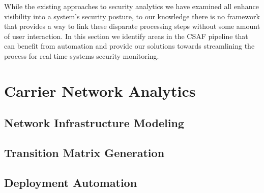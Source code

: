 While the existing approaches to security analytics we have examined all enhance visibility into a system's security posture, to our knowledge there is no framework that provides a way to link these disparate processing steps without some amount of user interaction. In this section we identify areas in the CSAF pipeline that can benefit from automation and provide our solutions towards streamlining the process for real time systems security monitoring.%

\section{Carrier Network Analytics}\label{sec:contribs:main}


\subsection{Network Infrastructure Modeling}\label{subsec:contribs:modeling}


\subsection{Transition Matrix Generation}\label{subsec:contribs:trans}


\subsection{Deployment Automation}\label{subsec:contribs:deploy}

